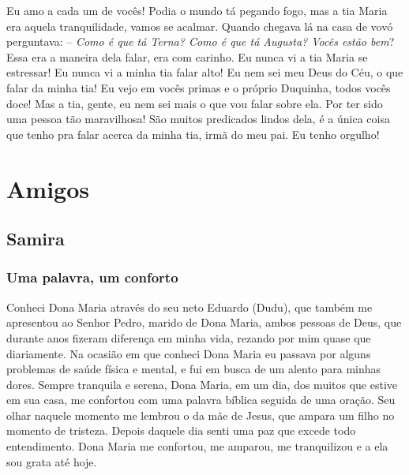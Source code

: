 \documentclass[
  brazil,
  a6paper,
  oneside,
  landscape,
  14pt]{scrbook}
\begin{document}
Eu amo a cada um de vocês! Podia o mundo tá pegando fogo, mas a tia
Maria era aquela tranquilidade, vamos se acalmar. Quando chegava lá na
casa de vovó perguntava: -- \emph{Como é que tá Terna? Como é que tá
Augusta? Vocês estão bem}? Essa era a maneira dela falar, era com
carinho. Eu nunca vi a tia Maria se estressar! Eu nunca vi a minha tia
falar alto! Eu nem sei meu Deus do Céu, o que falar da minha tia! Eu
vejo em vocês primas e o próprio Duquinha, todos vocês doce! Mas a tia,
gente, eu nem sei mais o que vou falar sobre ela. Por ter sido uma
pessoa tão maravilhosa! São muitos predicados lindos dela, é a única
coisa que tenho pra falar acerca da minha tia, irmã do meu pai. Eu tenho
orgulho!

\hypertarget{amigos}{%
\chapter{Amigos}\label{amigos}}

\hypertarget{samira}{%
\section{Samira}\label{samira}}

\hypertarget{uma-palavra-um-conforto}{%
\subsection{Uma palavra, um conforto}\label{uma-palavra-um-conforto}}

Conheci Dona Maria através do seu neto Eduardo (Dudu), que também me
apresentou ao Senhor Pedro, marido de Dona Maria, ambos pessoas de Deus,
que durante anos fizeram diferença em minha vida, rezando por mim quase
que diariamente. Na ocasião em que conheci Dona Maria eu passava por
alguns problemas de saúde física e mental, e fui em busca de um alento
para minhas dores. Sempre tranquila e serena, Dona Maria, em um dia, dos
muitos que estive em sua casa, me confortou com uma palavra bíblica
seguida de uma oração. Seu olhar naquele momento me lembrou o da mãe de
Jesus, que ampara um filho no momento de tristeza. Depois daquele dia
senti uma paz que excede todo entendimento. Dona Maria me confortou, me
amparou, me tranquilizou e a ela sou grata até hoje.

\backmatter
\end{document}
